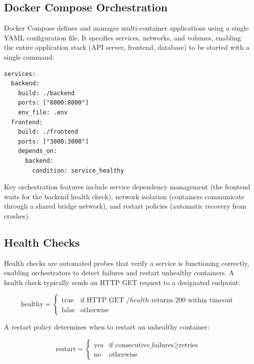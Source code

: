 \documentclass[10pt,a4paper]{article}
\begin{document}
\subsection{Docker Compose Orchestration}
\label{sec:docker-compose}

Docker Compose defines and manages multi-container applications using a single YAML configuration file. It specifies services, networks, and volumes, enabling the entire application stack (API server, frontend, database) to be started with a single command:

\begin{lstlisting}[basicstyle=\ttfamily\small]
services:
  backend:
    build: ./backend
    ports: ["8000:8000"]
    env_file: .env
  frontend:
    build: ./frontend
    ports: ["3000:3000"]
    depends_on:
      backend:
        condition: service_healthy
\end{lstlisting}

Key orchestration features include service dependency management (the frontend waits for the backend health check), network isolation (containers communicate through a shared bridge network), and restart policies (automatic recovery from crashes).

\subsection{Health Checks}
\label{sec:health-checks}

Health checks are automated probes that verify a service is functioning correctly, enabling orchestrators to detect failures and restart unhealthy containers. A health check typically sends an HTTP GET request to a designated endpoint:

\begin{equation}
\text{healthy} = \begin{cases} \text{true} & \text{if HTTP GET } /health \text{ returns 200 within timeout} \\ \text{false} & \text{otherwise} \end{cases}
\label{eq:health-check}
\end{equation}

A restart policy determines when to restart an unhealthy container:

\begin{equation}
\text{restart} = \begin{cases} \text{yes} & \text{if consecutive\_failures} \geq \text{retries} \\ \text{no} & \text{otherwise} \end{cases}
\label{eq:restart-policy}
\end{equation}
\end{document}
